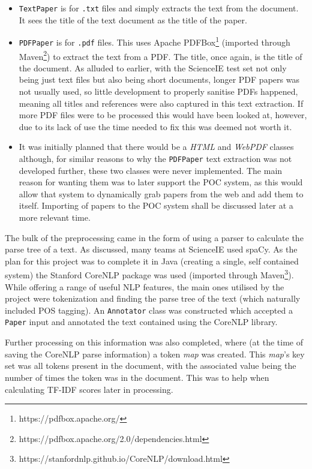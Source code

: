 \begin{itemize}
	\item \texttt{TextPaper} is for \texttt{.txt} files and simply extracts the text from the document. It sees the title of the text document as the title of the paper.
	\item \texttt{PDFPaper} is for \texttt{.pdf} files. This uses Apache PDFBox\footnote{https://pdfbox.apache.org/} (imported through Maven\footnote{https://pdfbox.apache.org/2.0/dependencies.html}) to extract the text from a PDF. The title, once again, is the title of the document. As alluded to earlier, with the ScienceIE test set not only being just text files but also being short documents, longer PDF papers was not usually used, so little development to properly sanitise PDFs happened, meaning all titles and references were also captured in this text extraction. If more PDF files were to be processed this would have been looked at, however, due to its lack of use the time needed to fix this was deemed not worth it.
	\item It was initially planned that there would be a \textit{HTML} and \textit{WebPDF} classes although, for similar reasons to why the \texttt{PDFPaper} text extraction was not developed further, these two classes were never implemented. The main reason for wanting them was to later support the POC system, as this would allow that system to dynamically grab papers from the web and add them to itself. Importing of papers to the POC system shall be discussed later at a more relevant time.
\end{itemize}

The bulk of the preprocessing came in the form of using a parser to calculate the parse tree of a text. As discussed, many teams at ScienceIE used spaCy. As the plan for this project was to complete it in Java (creating a single, self contained system) the Stanford CoreNLP package was used \cite{Manning2014} (imported through Maven\footnote{https://stanfordnlp.github.io/CoreNLP/download.html}). While offering a range of useful NLP features, the main ones utilised by the project were tokenization and finding the parse tree of the text (which naturally included POS tagging). An \texttt{Annotator} class was constructed which accepted a \texttt{Paper} input and annotated the text contained using the CoreNLP library.

Further processing on this information was also completed, where (at the time of saving the CoreNLP parse information) a token \textit{map} was created. This \textit{map}'s key set was all tokens present in the document, with the associated value being the number of times the token was in the document. This was to help when calculating TF-IDF scores later in processing.

